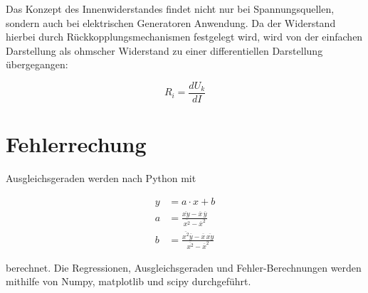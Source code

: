 Das Konzept des Innenwiderstandes findet nicht nur bei Spannungsquellen, sondern auch bei elektrischen Generatoren Anwendung.
Da der Widerstand hierbei durch Rückkopplungsmechanismen festgelegt wird, wird von der einfachen Darstellung als ohmscher Widerstand zu einer differentiellen Darstellung übergegangen:

\begin{equation}
  R_i = \frac{dU_k}{dI}
\end{equation}

\section{Fehlerrechung}
\label{sec:Fehlerrechnung}

Ausgleichsgeraden werden nach Python mit

\begin{align}
  y &= a \cdot x + b \label{eqn:ausgleich}\\
  a &= \frac{\overline{xy}-\overline{x} \, \overline{y}}{\overline{x^2}-\overline{x}^2} \\
  b &= \frac{\overline{x^2}\overline{y}-\overline{x} \, \overline{xy}}{\overline{x^2}-\overline{x}^2}
\end{align}

\noindent berechnet. Die Regressionen, Ausgleichsgeraden und Fehler-Berechnungen werden mithilfe von Numpy, matplotlib und scipy durchgeführt.
